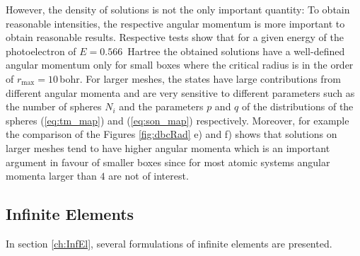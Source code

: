 However, the density of solutions is not the only important quantity: To obtain reasonable intensities, the respective angular momentum is more important to obtain reasonable results.
Respective tests show that for a given energy of the photoelectron of $E=0.566\,$ Hartree the obtained solutions have a well-defined angular momentum only for small boxes where the critical radius is in the order of $r_\text{max}=10\,$bohr.
For larger meshes, the states have large contributions from different angular momenta and are very sensitive to different parameters such as the number of spheres $N_i$ and the parameters $p$ and $q$ of the distributions of the spheres (\ref{eq:tm_map}) and (\ref{eq:son_map}) respectively.
Moreover, for example the comparison of the Figures \ref{fig:dbcRad} e) and f) shows that solutions on larger meshes tend to have higher angular momenta which is an important argument in favour of smaller boxes since for most atomic systems angular momenta larger than $4$ are not of interest.


\subsection{Infinite Elements}
\label{sec:iBCbench}
In section \ref{ch:InfEl}, several formulations of infinite elements are presented.

